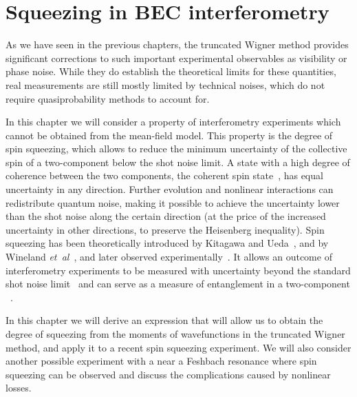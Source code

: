\chapter{Squeezing in BEC interferometry}
\label{cha:bec-squeezing}

As we have seen in the previous chapters, the truncated Wigner method provides significant corrections to such important experimental observables as visibility or phase noise.
While they do establish the theoretical limits for these quantities, real measurements are still mostly limited by technical noises, which do not require quasiprobability methods to account for.

In this chapter we will consider a property of  interferometry experiments which cannot be obtained from the mean-field model.
This property is the degree of spin squeezing, which allows to reduce the minimum uncertainty of the collective spin of a two-component  below the shot noise limit.
A state with a high degree of coherence between the two components, the coherent spin state~\cite{Kitagawa1993}, has equal uncertainty in any direction.
Further evolution and nonlinear interactions can redistribute quantum noise, making it possible to achieve the uncertainty lower than the shot noise along the certain direction (at the price of the increased uncertainty in other directions, to preserve the Heisenberg inequality).
Spin squeezing has been theoretically introduced by Kitagawa and Ueda~\cite{Kitagawa1993}, and by Wineland \textit{et~al}~\cite{Wineland1994}, and later observed experimentally~\cite{Hald1999,Kuzmich2000}.
It allows an outcome of interferometry experiments to be measured with uncertainty beyond the standard shot noise limit~\cite{Riedel2010,Gross2010} and can serve as a measure of entanglement in a two-component ~\cite{Sorensen2001}.

In this chapter we will derive an expression that will allow us to obtain the degree of squeezing from the moments of wavefunctions in the truncated Wigner method, and apply it to a recent spin squeezing experiment.
We will also consider another possible experiment with a  near a Feshbach resonance where spin squeezing can be observed and discuss the complications caused by nonlinear losses.






